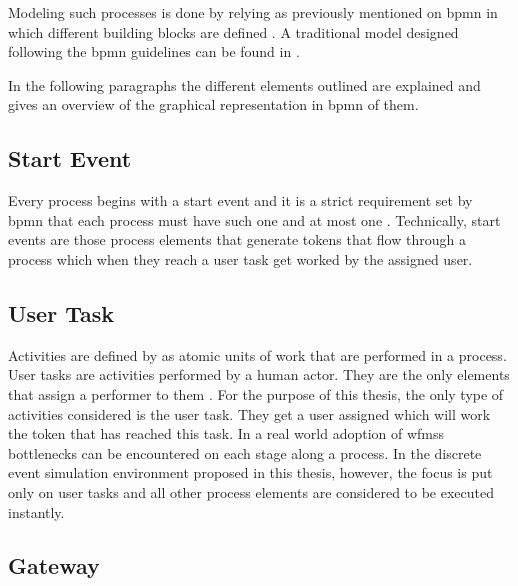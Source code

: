 Modeling such processes is done by relying as previously mentioned on \gls{bpmn} in which different building blocks are defined \citep{Silver2011}. A traditional model designed following the \gls{bpmn} guidelines can be found in .


In the following paragraphs the different elements outlined are explained and  gives an overview of the graphical representation in \gls{bpmn} of them.


\subsection{Start Event}

Every process begins with a start event and it is a strict requirement set by \gls{bpmn} that each process must have such one and at most one \citep{Silver2011}. Technically, start events are those process elements that generate tokens that flow through a process which when they reach a user task get worked by the assigned user.

\subsection{User Task}

Activities are defined by \citet{Silver2011} as atomic units of work that are performed in a process. User tasks are activities performed by a human actor. They are the only elements that assign a performer to them \citep{Silver2011}. For the purpose of this thesis, the only type of activities considered is the user task. They get a user assigned which will work the token that has reached this task. In a real world adoption of \glspl{wfms} bottlenecks can be encountered on each stage along a process. In the discrete event simulation environment proposed in this thesis, however, the focus is put only on user tasks and all other process elements are considered to be executed instantly.

\subsection{Gateway}


